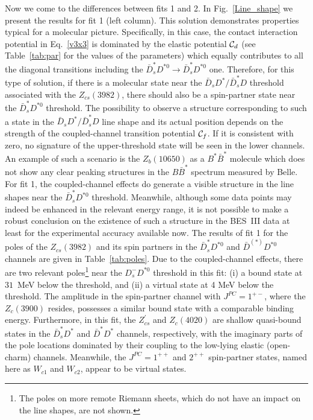 \documentclass[preprint,12pt,3p]{elsarticle}
\begin{document}
Now we come to the differences between fits 1 and 2. In Fig.~\ref{Line_shape} we present the results for fit 1 (left column). This solution demonstrates properties typical for a molecular picture. Specifically, in this case, the contact interaction potential in Eq.~\eqref{v3x3} is dominated by the elastic potential ${\cal C}_d$ (see Table~\ref{tab:par} for the values of the parameters) which equally contributes to all the diagonal transitions including the $\bar{D}_s^* D^{*0}\to \bar{D}_s^* D^{*0}$ one. Therefore, for this type of solution, if there is a molecular state near the $\bar{D}_s D^*/ \bar{D}_s^* D$ threshold associated with the $Z_{cs}(3982)$, there should also be a spin-partner state near the $\bar{D}_s^* D^{*0}$ threshold. 
The possibility to observe a structure corresponding to such a state in the $\bar{D}_s D^*/ \bar{D}_s^* D$ line shape and its actual position depends on the strength of the coupled-channel transition potential ${\cal C}_f$. If it is consistent with zero, no signature of the upper-threshold 
state will be seen in the lower channels. An example of such a scenario is the $Z_b(10650)$ as a $B^*\bar B^*$ molecule which does not show any clear peaking structures in the $B\bar B^*$ spectrum \cite{Voloshin:2016cgm,Wang:2018jlv} measured by Belle. For fit 1, the coupled-channel effects do generate a visible structure in the line shapes near the $\bar{D}_s^* D^{*0}$ threshold. Meanwhile, although some data points may indeed be enhanced in the relevant energy range, it is not possible to make a robust conclusion on the existence of such a structure in the BES~III data at least for the experimental accuracy available now. The results of fit 1 for the poles of the $Z_{cs}(3982)$ and its spin partners in the $\bar{D}_s^* D^{*0}$ and 
$\bar{D}^{(*)} D^{*0}$ channels are given in Table~\ref{tab:poles}. Due to the coupled-channel effects, there are two relevant poles\footnote{The poles on more remote Riemann 
sheets, which do not have an impact on the line shapes, are not shown.} near the $D_s^- D^{*0}$ threshold in this fit: 
(i) a bound state at $31$~MeV below the threshold, and
(ii) a virtual state at 4 MeV below the threshold.
The amplitude in the spin-partner channel with $J^{PC}=1^{+-}$, where the $Z_c(3900)$ resides, possesses a similar bound state with a comparable binding energy. Furthermore, in this fit, the $Z_{cs}^\prime$ and $Z_{c}(4020)$ are shallow quasi-bound states in the $\bar{D}_s^* D^*$ and $\bar{D}^* D^*$ channels, respectively, with the imaginary parts of the pole locations dominated by their coupling to the low-lying elastic (open-charm) channels. Meanwhile, the $J^{PC} = 1^{++}$ and $2^{++}$ spin-partner states, named here as $W_{c1}$ and $W_{c2}$, appear to be virtual states. 
\end{document}
